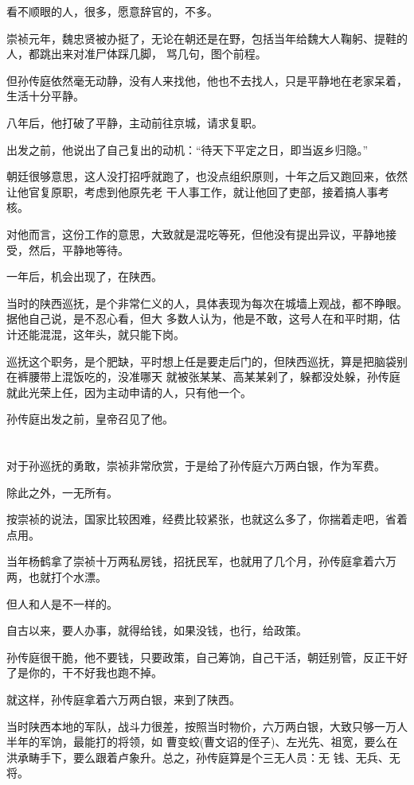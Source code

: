 \documentclass[11pt,a4paper,onecolumn]{article}
\begin{document}
看不顺眼的人，很多，愿意辞官的，不多。

崇祯元年，魏忠贤被办挺了，无论在朝还是在野，包括当年给魏大人鞠躬、提鞋的人，都跳出来对准尸体踩几脚，
骂几句，图个前程。

但孙传庭依然毫无动静，没有人来找他，他也不去找人，只是平静地在老家呆着，生活十分平静。

八年后，他打破了平静，主动前往京城，请求复职。

出发之前，他说出了自己复出的动机：``待天下平定之日，即当返乡归隐。''

朝廷很够意思，这人没打招呼就跑了，也没点组织原则，十年之后又跑回来，依然让他官复原职，考虑到他原先老
干人事工作，就让他回了吏部，接着搞人事考核。

对他而言，这份工作的意思，大致就是混吃等死，但他没有提出异议，平静地接受，然后，平静地等待。

一年后，机会出现了，在陕西。

当时的陕西巡抚，是个非常仁义的人，具体表现为每次在城墙上观战，都不睁眼。据他自己说，是不忍心看，但大
多数人认为，他是不敢，这号人在和平时期，估计还能混混，这年头，就只能下岗。

巡抚这个职务，是个肥缺，平时想上任是要走后门的，但陕西巡抚，算是把脑袋别在裤腰带上混饭吃的，没准哪天
就被张某某、高某某剁了，躲都没处躲，孙传庭就此光荣上任，因为主动申请的人，只有他一个。

孙传庭出发之前，皇帝召见了他。

\section[\thesection]{}

对于孙巡抚的勇敢，崇祯非常欣赏，于是给了孙传庭六万两白银，作为军费。

除此之外，一无所有。

按崇祯的说法，国家比较困难，经费比较紧张，也就这么多了，你揣着走吧，省着点用。

当年杨鹤拿了崇祯十万两私房钱，招抚民军，也就用了几个月，孙传庭拿着六万两，也就打个水漂。

但人和人是不一样的。

自古以来，要人办事，就得给钱，如果没钱，也行，给政策。

孙传庭很干脆，他不要钱，只要政策，自己筹饷，自己干活，朝廷别管，反正干好了是你的，干不好我也跑不掉。

就这样，孙传庭拿着六万两白银，来到了陕西。

当时陕西本地的军队，战斗力很差，按照当时物价，六万两白银，大致只够一万人半年的军饷，最能打的将领，如
曹变蛟(曹文诏的侄子)、左光先、祖宽，要么在洪承畴手下，要么跟着卢象升。总之，孙传庭算是个三无人员：无
钱、无兵、无将。
\end{document}
